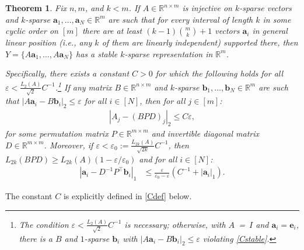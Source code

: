 \documentclass[journal, twocolumn]{IEEEtran}
\newtheorem{theorem}{Theorem}
\begin{document}
\begin{theorem}\label{DeterministicUniquenessTheorem}
Fix $n, m$, and $k < m$. If $A \in \mathbb{R}^{n \times m}$ is injective on $k$-sparse vectors and $k$-sparse \mbox{$\mathbf{a}_1, \ldots, \mathbf{a}_N \in \mathbb{R}^m$} are such that for every interval of length $k$ in some cyclic order on $[m]$ there are at least \mbox{$(k-1){m \choose k}+1$} vectors $\mathbf{a}_i$ in general linear position (i.e., any $k$ of them are linearly independent) supported there, then $Y = \{A\mathbf{a}_1, \ldots, A\mathbf{a}_N\}$ has a stable $k$-sparse representation in $\mathbb{R}^m$.

Specifically, there exists a constant $C > 0$ for which the following holds for all $\varepsilon < \frac{L_2(A)}{\sqrt{2}}C^{-1}$.\footnote{The condition $\varepsilon < \frac{L_2(A)}{\sqrt{2}}C^{-1}$ is necessary; otherwise,  with \mbox{$A$ = $I$} and $\mathbf{a}_i = \mathbf{e}_i$, there is a $B$ and $1$-sparse $\mathbf{b}_i$ with $|A\mathbf{a}_i - B\mathbf{b}_i|_2 \leq \varepsilon$ violating \eqref{Cstable}.} If any matrix $B \in \mathbb{R}^{n \times m}$ and $k$-sparse $\mathbf{b}_1, \ldots, \mathbf{b}_N \in \mathbb{R}^m$ are such that \mbox{$|A\mathbf{a}_i - B\mathbf{b}_i|_2 \leq \varepsilon$} for all $i \in [N]$, then for all $j \in [m]$:
\begin{align}\label{Cstable}
|A_j-(BPD)_j|_2 \leq C\varepsilon,
\end{align}
%
for some permutation matrix $P \in \mathbb{R}^{m \times m}$ and invertible diagonal matrix $D \in \mathbb{R}^{m \times m}$. Moreover, if $\varepsilon < \varepsilon_0 := \frac{L_{2k}(A)}{\sqrt{2k}}C^{-1}$, then $L_{2k}(BPD) \geq L_{2k}(A)\left( 1 - \varepsilon / \varepsilon_0 \right)$ and for all $i \in [N]$:
\begin{align}\label{b-PDa}
|\mathbf{a}_i - D^{-1}P^{\top}\mathbf{b}_i|_1 &\leq \frac{\varepsilon }{ \varepsilon_0 - \varepsilon} \left( C^{-1}+|\mathbf{a}_i|_1 \right).
\end{align}
\end{theorem} 
The constant $C$ is explicitly defined in \eqref{Cdef} below.


\end{document}
